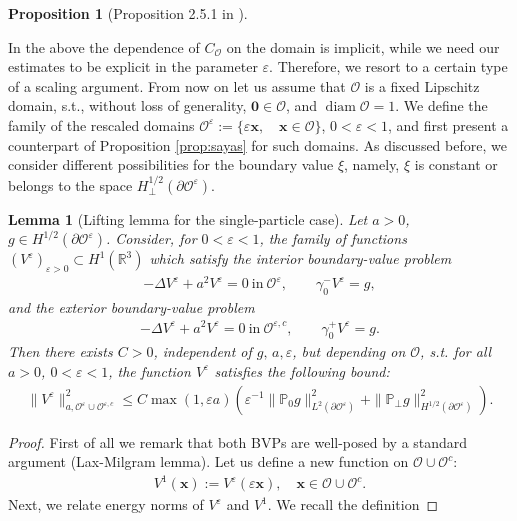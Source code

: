 \documentclass[]{article}
\newtheorem{lemma}{Lemma}
\newtheorem{proposition}{Proposition}
\numberwithin{equation}{section}
\numberwithin{theorem}{section}
\numberwithin{lemma}{section}
\numberwithin{corollary}{section}
\numberwithin{proposition}{section}
\numberwithin{definition}{section}
\newcommand{\re}{\varepsilon}
\renewcommand{\O}{\mathcal{O}}
\renewcommand{\vec}{\boldsymbol}
\begin{document}
\begin{appendices}
\begin{proposition}[Proposition 2.5.1 in \cite{sayas}]
		\end{proposition}
		In the above the dependence of $C_{\mathcal{O}}$ on the domain is implicit, while we need our estimates to be explicit in the parameter $\varepsilon$. Therefore, we resort to a certain type of a scaling argument. From now on let us assume that $\mathcal{O}$ is a fixed Lipschitz domain, s.t., without loss of generality, $\vec{0}\in\O$, and  $\operatorname{diam}\mathcal{O}=1$. We define the family of the rescaled domains $\O^{\re}:=\{\re\vec{x}, \quad \vec{x}\in \O\}$, $0<\re<1$, and first present a counterpart of Proposition \ref{prop:sayas} for such domains. As discussed before, we consider different possibilities for the boundary value $\xi$, namely, $\xi$ is constant or belongs to the space $H^{1/2}_{\perp}(\partial\O^{\re})$. 
		\begin{lemma}[Lifting lemma for the single-particle case]
			\label{lemma:lifting}
			Let $a > 0 $, $g\in H^{1/2}(\partial\O^{\re})$. Consider, for $0<\re<1$, the family of functions  $(V^{\re})_{\re>0}\subset H^1(\mathbb{R}^3)$ which satisfy the interior boundary-value problem 
			\begin{align*}%
				- \Delta V^{\re} + a^2 V^{\re} = 0~\text{in}~\mathcal{O}^{\re}, \quad \quad \gamma^{-}_0 V^{\re} = g,
			\end{align*}
			and the exterior boundary-value problem 
			\begin{align*}%
				- \Delta V^{\re} + a^2 V^{\re} = 0~\text{in}~\mathcal{O}^{\re,c}, \quad \quad \gamma^{+}_0 V^{\re} = g.
			\end{align*}
			Then there exists $C>0$, independent of $g, \, a, \re$, but depending on $\O$, s.t. for all $a>0$,  $0<\re<1$, the function $V^{\re}$ satisfies the following bound:
			\begin{align*}%
				\| V^{\re} \|^2_{a,\O^{\re}\cup\O^{\re,c}} \leq C \max(1,\re a) \left(\re^{-1} \| \mathbb{P}_0g\|^2_{L^2(\partial \mathcal{O}^{\re})}+ \| \mathbb{P}_{\perp}g\|^2_{H^{1/2}(\partial \mathcal{O}^{\re})}\right).
			\end{align*}
		\end{lemma}
		\begin{proof}
			First of all we remark that both BVPs are well-posed by a standard argument (Lax-Milgram lemma).  Let us define a new function on $\O\cup\O^c$:
			\begin{align*}%
				V^1(\vec{x}):=V^{\re}(\re \vec{x}), \quad \vec{x}\in \O\cup\O^{c}.
			\end{align*}
			Next, we relate energy norms of $V^{\re}$ and $V^1$. We recall the definition 

\end{proof}
\end{appendices}
\end{document}
